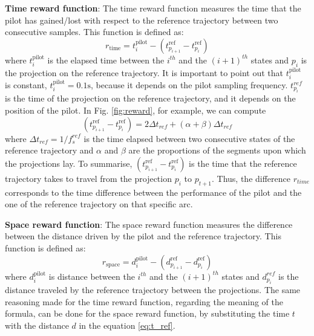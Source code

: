 \textbf{Time reward function}: The time reward function measures the time that the pilot has gained/lost with respect to the reference trajectory between two consecutive samples. This function is defined as:
\begin{equation} r_{\text{time}} = t^{\text{pilot}}_i - (t^{\text{ref}}_{p_{i+1}} - t^{\text{ref}}_{p_i} )\end{equation}
where \(t^{\text{pilot}}_i\) is the elapsed time between the $i^{th}$ and the $(i+1)^{th}$ states and $p_i$ is the projection on the reference trajectory.
It is important to point out that $t^{\text{pilot}}_i$ is constant, $t^{\text{pilot}}_i=0.1 \text{s}$, because it depends on the pilot sampling frequency. $t^{ref}_{p_i}$ is the time of the projection on the reference trajectory, and it depends on the position of the pilot.
In Fig. \ref{fig:reward}, for example, we can compute
\begin{equation}(t^{\text{ref}}_{p_{i+1}} - t^{\text{ref}}_{p_i} ) = 2\Delta t_{ref} + (\alpha + \beta)\Delta t_{ref}
\label{eq:t_ref}\end{equation}
where $\Delta t_{ref}=1/f_s^{ref}$ is the time elapsed between two consecutive states of the reference trajectory and $\alpha$ and $\beta$ are the proportions of the segments upon which the projections lay.
To summarise, $(t^{\text{ref}}_{p_{i+1}} - t^{\text{ref}}_{p_i} )$ is the time that the reference trajectory takes to travel from the projection $p_i$ to $p_{t+1}$. Thus, the difference $r_{time}$ corresponds to the time difference between the performance of the pilot and the one of the reference trajectory on that specific arc.


\textbf{Space reward function}: The space reward function measures the difference between the distance driven by the pilot and the reference trajectory. This function is defined as:
\begin{equation}
\label{eq:r_space}
 r_{\text{space}} = d^{\text{pilot}}_i - (d^{\text{ref}}_{p_{i+1}} - d^{\text{ref}}_{p_i} )\end{equation}
where \(d^{\text{pilot}}_i\) is distance between the $i^{th}$ and the $(i+1)^{th}$ states and $d^{ref}_{p_i}$ is the distance traveled by the reference trajectory between the projections.
The same reasoning made for the time reward function, regarding the meaning of the formula, can be done for the space reward function, by substituting the time $t$ with the distance $d$ in the equation \ref{eq:t_ref}.

